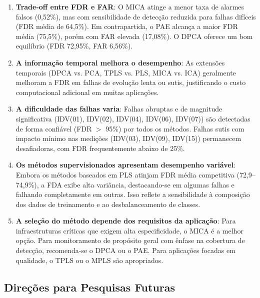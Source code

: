 \documentclass[journal]{IEEEtran}
\begin{document}
\begin{enumerate}
    \item \textbf{Trade-off entre FDR e FAR}: O MICA atinge a menor taxa de alarmes falsos (0,52\%), mas com sensibilidade de detecção reduzida para falhas difíceis (FDR média de 64,5\%). Em contrapartida, o PAE alcança a maior FDR média (75,5\%), porém com FAR elevada (17,08\%). O DPCA oferece um bom equilíbrio (FDR 72,95\%, FAR 6,56\%).
    
    \item \textbf{A informação temporal melhora o desempenho}: As extensões temporais (DPCA vs. PCA, TPLS vs. PLS, MICA vs. ICA) geralmente melhoram a FDR em falhas de evolução lenta ou sutis, justificando o custo computacional adicional em muitas aplicações.
    
    \item \textbf{A dificuldade das falhas varia}: Falhas abruptas e de magnitude significativa (IDV(01), IDV(02), IDV(04), IDV(06), IDV(07)) são detectadas de forma confiável (FDR $>$ 95\%) por todos os métodos. Falhas sutis com impacto mínimo nas medições (IDV(03), IDV(09), IDV(15)) permanecem desafiadoras, com FDR frequentemente abaixo de 25\%.
    
    \item \textbf{Os métodos supervisionados apresentam desempenho variável}: Embora os métodos baseados em PLS atinjam FDR média competitiva (72,9--74,9\%), a FDA exibe alta variância, destacando-se em algumas falhas e falhando completamente em outras. Isso reflete a sensibilidade à composição dos dados de treinamento e ao desbalanceamento de classes.
    
    \item \textbf{A seleção do método depende dos requisitos da aplicação}: Para infraestruturas críticas que exigem alta especificidade, o MICA é a melhor opção. Para monitoramento de propósito geral com ênfase na cobertura de detecção, recomenda-se o DPCA ou o PAE. Para aplicações focadas em qualidade, o TPLS ou o MPLS são apropriados.
\end{enumerate}
\subsection{Direções para Pesquisas Futuras}
\label{subsec:future_work}
\end{document}
